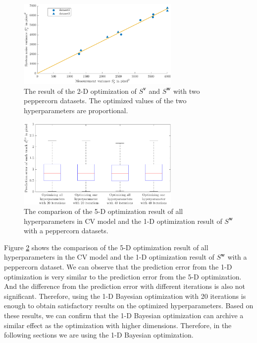 \begin{figure}[htbp]
\centering
\includegraphics[width=0.7\textwidth]{figures/KF/bayopt/opt 2d cv.png}
\caption{The result of the 2-D optimization of $S^{\boldsymbol{v}}$ and $S^{\boldsymbol{w}}$ with two peppercorn datasets. The optimized values of the two hyperparameters are proportional.}
\label{opt 2d}
\end{figure}

\begin{figure}[htbp]
\centering
\includegraphics[width=0.7\textwidth]{figures/KF/bayopt/effect opt all.png}
\caption{The comparison of the 5-D optimization result of all hyperparameters in CV model and the 1-D optimization result of $S^{\boldsymbol{w}}$ with a peppercorn datasets. }
\label{opt 5d}
\end{figure}

Figure \ref{opt 5d} shows the comparison of the 5-D optimization result of all hyperparameters in the CV model and the 1-D optimization result of $S^{\boldsymbol{w}}$ with a peppercorn dataset. We can observe that the prediction error from the 1-D optimization is very similar to the prediction error from the 5-D optimization. And the difference from the prediction error with different iterations is also not significant. Therefore, using the 1-D Bayesian optimization with 20 iterations is enough to obtain satisfactory results on the optimized hyperparameters. Based on these results, we can confirm that the 1-D Bayesian optimization can archive a similar effect as the optimization with higher dimensions. Therefore, in the following sections we are using the 1-D Bayesian optimization.   



